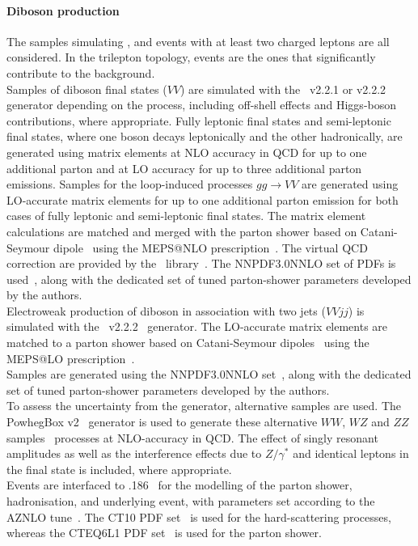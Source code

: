 \paragraph{Diboson production} 
The samples simulating \PW{}\PW, \PW{}\PZ and \PZ{}\PZ events with at least two charged leptons are all considered.
In the trilepton topology, \PW{}\PZ events are the ones that significantly contribute to the background.\\
Samples of diboson final states ($VV$) are simulated with the
\sherpa~v2.2.1 or v2.2.2~\cite{Bothmann:2019yzt} generator depending on the process,
including off-shell effects and Higgs-boson contributions, where appropriate.
Fully leptonic final states and semi-leptonic final states, where one boson
decays leptonically and the other hadronically, are generated using
matrix elements at NLO accuracy in QCD for up to one additional parton
and at LO accuracy for up to three additional parton
emissions. Samples for the loop-induced processes $gg \to VV$ are
generated using LO-accurate matrix elements for up to one
additional parton emission for both cases of fully leptonic and
semi-leptonic final states. The matrix element calculations are matched
and merged with the \sherpa parton shower based on Catani-Seymour
dipole~\cite{Gleisberg:2008fv,Schumann:2007mg} using the MEPS@NLO
prescription~\cite{Hoeche:2011fd,Hoeche:2012yf,Catani:2001cc,Hoeche:2009rj}.
The virtual QCD correction are provided by the
\openloops\ library~\cite{Cascioli:2011va,Denner:2016kdg}. The 
\textsc{NNPDF3.0NNLO} set of PDFs is used~\cite{Ball:2014uwa}, along with the
dedicated set of tuned parton-shower parameters developed by the
\sherpa authors.\\
Electroweak production of diboson in association with two jets
($VVjj$) is simulated with the \sherpa~v2.2.2~\cite{Bothmann:2019yzt}
generator. The LO-accurate matrix elements are matched to a parton
shower based on Catani-Seymour dipoles~\cite{Gleisberg:2008fv,Schumann:2007mg} using the MEPS@LO
prescription~\cite{Hoeche:2011fd,Hoeche:2012yf,Catani:2001cc,Hoeche:2009rj}.\\
Samples are generated using the \textsc{NNPDF3.0NNLO} set~\cite{Ball:2014uwa},
along with the dedicated set of tuned parton-shower parameters
developed by the \sherpa authors.\\
To assess the uncertainty from the generator, alternative samples are used. 
The PowhegBox v2~\cite{Nason:2004rx,Frixione:2007vw,Alioli:2010xd} generator
is used to generate these alternative $WW$, $WZ$ and $ZZ$ samples~\cite{Nason:2013ydw}
processes at NLO-accuracy in QCD. The effect of singly resonant
amplitudes as well as the interference effects due to $Z/\gamma^*$ and
identical leptons in the final state is included, where appropriate. \\
Events are interfaced to \pythia{}.186~\cite{Sjostrand:2007gs}
for the modelling of the parton shower, hadronisation, and underlying
event, with parameters set according to the AZNLO
tune~\cite{STDM-2012-23}. The CT10 PDF set~\cite{Lai:2010vv} is used
for the hard-scattering processes, whereas the CTEQ6L1 PDF
set~\cite{Pumplin:2002vw} is used for the parton shower. 

